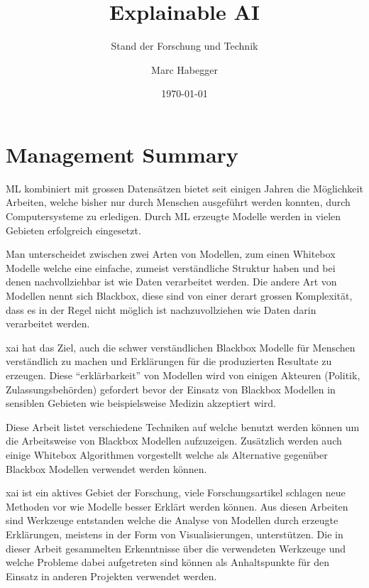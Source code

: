 \documentclass[
  12pt, %
  a4paper, %
  oneside, %
  openany, 
  numbers=noenddot, %
  BCOR=5mm, %
  parskip=half*, %
  thesis, %
]{bfhbook}
\author{Marc Habegger}
\title{Explainable AI}
\subtitle{Stand der Forschung und Technik}
\date{\today} %
\begin{document}
                         
\maketitle

\tableofcontents
\sloppy
\mainmatter %

\RaggedRight

\chapter{Management Summary}
\Gls{ML} kombiniert mit grossen Datensätzen bietet seit einigen Jahren die Möglichkeit Arbeiten, welche bisher nur durch Menschen ausgeführt werden konnten, durch Computersysteme zu erledigen. Durch \Gls{ML} erzeugte Modelle werden in vielen Gebieten erfolgreich eingesetzt. 

Man unterscheidet zwischen zwei Arten von Modellen, zum einen Whitebox Modelle welche eine einfache, zumeist verständliche Struktur haben und bei denen nachvollziehbar ist wie Daten verarbeitet werden. Die andere Art von Modellen nennt sich Blackbox, diese sind von einer derart grossen Komplexität, dass es in der Regel nicht möglich ist nachzuvollziehen wie Daten darin verarbeitet werden. 

\Gls{xai} hat das Ziel, auch die schwer verständlichen Blackbox Modelle für Menschen verständlich zu machen und Erklärungen für die produzierten Resultate zu erzeugen. Diese ``erklärbarkeit'' von Modellen wird von einigen Akteuren (Politik, Zulassungsbehörden) gefordert bevor der Einsatz von Blackbox Modellen in sensiblen Gebieten wie beispielsweise Medizin akzeptiert wird. 

Diese Arbeit listet verschiedene Techniken auf welche benutzt werden können um die Arbeitsweise von Blackbox Modellen aufzuzeigen.
Zusätzlich werden auch einige Whitebox Algorithmen vorgestellt welche als Alternative gegenüber Blackbox Modellen verwendet werden können.

\Gls{xai} ist ein aktives Gebiet der Forschung, viele Forschungsartikel schlagen neue Methoden vor wie Modelle besser Erklärt werden können. Aus diesen Arbeiten sind Werkzeuge entstanden welche die Analyse von Modellen durch erzeugte Erklärungen, meistens in der Form von Visualisierungen, unterstützen. Die in dieser Arbeit gesammelten Erkenntnisse über die verwendeten Werkzeuge und welche Probleme dabei aufgetreten sind können als Anhaltspunkte für den Einsatz in anderen Projekten verwendet werden.
\end{document}
